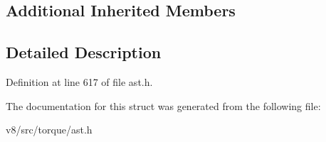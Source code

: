 \subsection*{Additional Inherited Members}


\subsection{Detailed Description}


Definition at line 617 of file ast.\+h.



The documentation for this struct was generated from the following file\+:\begin{DoxyCompactItemize}
\item 
v8/src/torque/ast.\+h\end{DoxyCompactItemize}
